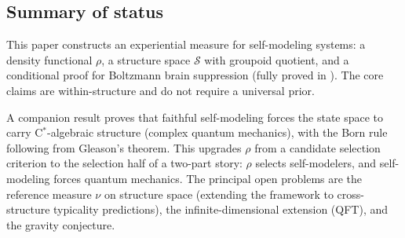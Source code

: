 \documentclass[12pt]{article}
\theoremstyle{remark}
\begin{document}
\subsection{Summary of status}

This paper constructs an experiential measure for self-modeling systems: a density functional $\rho$, a structure space $\mathcal{S}$ with groupoid quotient, and a conditional proof for Boltzmann brain suppression (fully proved in \cite{ehrlich2026thma}). The core claims are within-structure and do not require a universal prior.

A companion result \cite{ehrlich2026qm} proves that faithful self-modeling forces the state space to carry C$^*$-algebraic structure (complex quantum mechanics), with the Born rule following from Gleason's theorem. This upgrades $\rho$ from a candidate selection criterion to the selection half of a two-part story: $\rho$ selects self-modelers, and self-modeling forces quantum mechanics. The principal open problems are the reference measure $\nu$ on structure space (extending the framework to cross-structure typicality predictions), the infinite-dimensional extension (QFT), and the gravity conjecture.


\end{document}

